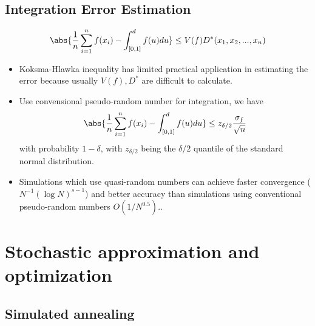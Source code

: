 \begin{refsection}
\subsection{Integration Error Estimation}

\begin{theorem}\cite[288]{glasserman2003monte}
	
	
	
	$$\abs{\frac{1}{n}\sum_{i=1}^n f(x_i) - \int_{[0,1]}^{d} f(u) du} \leq V(f)D^*(x_1,x_2,...,x_n)$$
\end{theorem}


\begin{remark}\hfill
	\begin{itemize}
		\item Koksma-Hlawka inequality has limited practical application in estimating the error because usually $V(f), D^*$ are difficult to calculate.
	\end{itemize}
\end{remark}


\begin{remark}
	\begin{itemize}
		\item Use convensional pseudo-random number for integration, we have
		$$\abs{\frac{1}{n}\sum_{i=1}^n f(x_i) - \int_{[0,1]}^{d} f(u) du} \leq z_{\delta/2} \frac{\sigma_f}{\sqrt{n}}$$
		with probability $1-\delta$, with $z_{\delta/2}$ being the $\delta/2$ quantile of the standard normal distribution.
		\item 
		Simulations which use quasi-random
		numbers can achieve faster convergence ($N^{-1}(\log N)^{s-1}$) and
		better accuracy than simulations using conventional
		pseudo-random numbers $O(1/N^{0.5})$.\cite[10]{niederreiter1992random}.
	\end{itemize}
\end{remark}


\section{Stochastic approximation and optimization}

\subsection{Simulated annealing}


\end{refsection}
